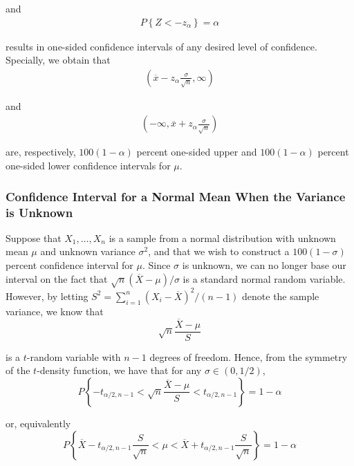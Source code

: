 \documentclass[12pt]{article}
\begin{document}
and
\begin{eqnarray*}
  P \left\{ Z < -z_{\alpha} \right\} = \alpha
\end{eqnarray*}

results in one-sided confidence intervals of any desired level of confidence. Specially, we obtain that
\begin{eqnarray*}
  \left( \overline{x} - z_{\alpha} \frac {\sigma}{\sqrt{n}}, \infty \right)
\end{eqnarray*}

and
\begin{eqnarray*}
  \left( -\infty, \overline{x} + z_{\alpha} \frac {\sigma}{\sqrt{n}} \right)
\end{eqnarray*}

are, respectively, $100(1 - \alpha)$ percent one-sided upper and $100(1 - \alpha)$ percent one-sided lower confidence intervals for $\mu$.

\subsubsection{Confidence Interval for a Normal Mean When the Variance is Unknown}

Suppose that $X_1, \dots, X_n$ is a sample from a normal distribution with unknown mean $\mu$ and unknown variance $\sigma^2$, and that we wish to construct a $100(1 - \sigma)$ percent confidence interval for $\mu$. Since $\sigma$ is unknown, we can no longer base our interval on the fact that $\sqrt{n}(\overline{X} - \mu) / \sigma$ is a standard normal random variable. However, by letting $S^2 = \sum_{i=1}^n (X_i - \overline{X})^2 / (n-1)$ denote the sample variance, we know that
\begin{equation*}
  \sqrt{n} \frac {\overline{X} - \mu}{S}
\end{equation*}

is a $t$-random variable with $n-1$ degrees of freedom. Hence, from the symmetry of the $t$-density function, we have that for any $\sigma \in (0, 1/2)$,
\begin{equation*}
  P \left\{ - t_{\alpha / 2, n-1} < 
    \sqrt{n} \frac {\overline{X} - \mu}{S}
    < t_{\alpha /2, n-1} \right\} = 1 - \alpha
\end{equation*}

or, equivalently
\begin{equation*}
  P \left\{ \overline{X} - t_{\alpha /2, n-1} \frac{S}{\sqrt{n}} < \mu
    < \overline{X} + t_{\alpha /2, n-1} \frac{S}{\sqrt{n}} \right\}
  = 1 - \alpha
\end{equation*}
\end{document}
